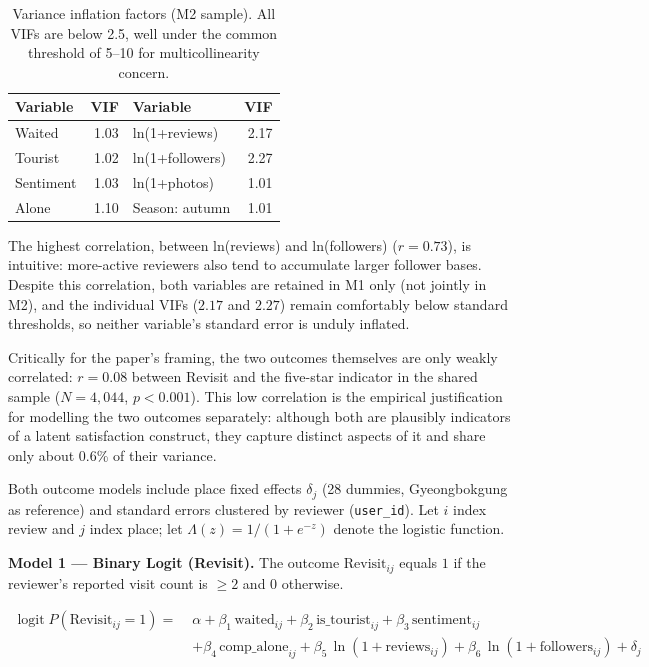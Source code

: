 \documentclass[10pt,a4paper]{article}
\newcommand{\subsect}[1]{\vspace{6pt}\noindent{\large\bfseries #1}\par\vspace{2pt}}
\begin{document}
\begin{table}[H]\centering
\caption{Variance inflation factors (M2 sample). All VIFs are below
2.5, well under the common threshold of 5--10 for multicollinearity
concern.}
\label{tab:vif}
\footnotesize
\begin{tabular}{@{}lr lr@{}}
\toprule
Variable          & VIF  & Variable          & VIF \\
\midrule
Waited             & 1.03 & ln(1+reviews)     & 2.17 \\
Tourist            & 1.02 & ln(1+followers)   & 2.27 \\
Sentiment          & 1.03 & ln(1+photos)      & 1.01 \\
Alone              & 1.10 & Season: autumn     & 1.01 \\
\bottomrule
\end{tabular}
\end{table}

The highest correlation, between ln(reviews) and ln(followers)
($r = 0.73$), is intuitive: more-active reviewers also tend to
accumulate larger follower bases. Despite this correlation, both
variables are retained in M1 only (not jointly in M2), and the
individual VIFs ($2.17$ and $2.27$) remain comfortably below standard
thresholds, so neither variable's standard error is unduly inflated.

Critically for the paper's framing, the two outcomes themselves are
only weakly correlated: $r = 0.08$ between Revisit and the five-star
indicator in the shared sample ($N = 4{,}044$, $p < 0.001$). This low
correlation is the empirical justification for modelling the two
outcomes separately: although both are plausibly indicators of a latent
satisfaction construct, they capture distinct aspects of it and share
only about 0.6\% of their variance.

\subsect{3.5 Models}
Both outcome models include place fixed effects $\delta_j$ (28 dummies,
Gyeongbokgung as reference) and standard errors clustered by reviewer
(\texttt{user\_id}). Let $i$ index review and $j$ index place; let
$\Lambda(z) = 1/(1+e^{-z})$ denote the logistic function.

\textbf{Model 1 --- Binary Logit (Revisit).} The outcome
$\text{Revisit}_{ij}$ equals $1$ if the reviewer's reported visit count
is $\ge 2$ and $0$ otherwise.

\begin{align*}
\operatorname{logit} P(\text{Revisit}_{ij} = 1)
   = \; &\alpha
       + \beta_{1}\,\text{waited}_{ij}
       + \beta_{2}\,\text{is\_tourist}_{ij}
       + \beta_{3}\,\text{sentiment}_{ij} \\
    &+ \beta_{4}\,\text{comp\_alone}_{ij}
       + \beta_{5}\,\ln(1 + \text{reviews}_{ij})
       + \beta_{6}\,\ln(1 + \text{followers}_{ij})
       + \delta_{j}
\end{align*}
\end{document}

